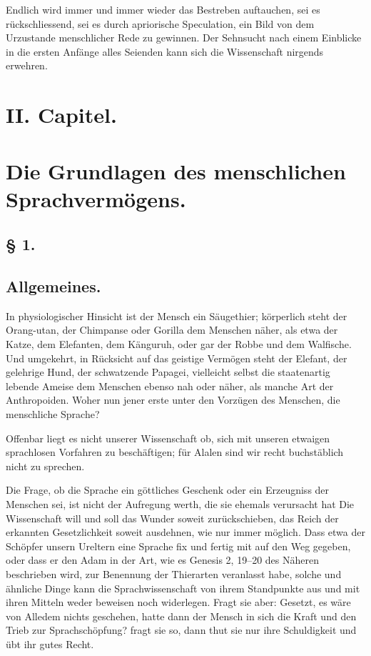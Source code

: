 Endlich wird immer und immer wieder das Bestreben auftauchen, sei es rückschliessend, sei es durch apriorische Speculation, ein Bild von dem Urzustande menschlicher Rede zu gewinnen. Der Sehnsucht nach einem Einblicke in die ersten Anfänge alles Seienden kann sich die Wissenschaft nirgends erwehren.

\section*{II. Capitel.}\label{IV.II}
\section*{Die Grundlagen des menschlichen Sprachvermögens.}
\subsection*{§ 1.}\label{IV.II.1}
\subsection*{Allgemeines.}
In physiologischer Hinsicht ist der Mensch ein Säugethier; körperlich steht der Orang-utan, der Chimpanse oder Gorilla dem Menschen näher, als etwa der Katze, dem Elefanten, dem Känguruh, oder gar der Robbe und dem Walfische. Und umgekehrt, in Rücksicht auf das geistige Vermögen steht der Elefant, der gelehrige Hund, der schwatzende Papagei, vielleicht selbst die staatenartig lebende Ameise dem Menschen ebenso nah oder näher, als manche Art der Anthropoiden. Woher nun jener erste unter den Vorzügen des Menschen, die menschliche Sprache?

Offenbar liegt es nicht unserer Wissenschaft ob, sich mit unseren etwaigen sprachlosen Vorfahren zu beschäftigen; für Alalen sind wir recht buchstäblich nicht zu sprechen.

Die Frage, ob die Sprache ein göttliches Geschenk oder ein Erzeugniss der Menschen sei, ist nicht der Aufregung werth, die sie ehemals verursacht hat Die Wissenschaft will und soll das Wunder soweit zurückschieben, das Reich der erkannten Gesetzlichkeit soweit ausdehnen, wie nur immer möglich. Dass etwa der Schöpfer unsern Ureltern eine \label{fp.294} Sprache fix und fertig mit auf den Weg gegeben, oder dass er den Adam in der Art, wie es Genesis 2, 19–20 des Näheren beschrieben wird, zur Benennung der Thierarten veranlasst habe, solche und ähnliche Dinge kann die Sprachwissenschaft von ihrem Standpunkte aus und mit ihren Mitteln weder beweisen noch widerlegen. Fragt sie aber: Gesetzt, es wäre von Alledem nichts geschehen, hatte dann der Mensch in sich die Kraft und den Trieb zur Sprachschöpfung? fragt sie so, dann thut sie nur ihre Schuldigkeit und übt ihr gutes Recht.

